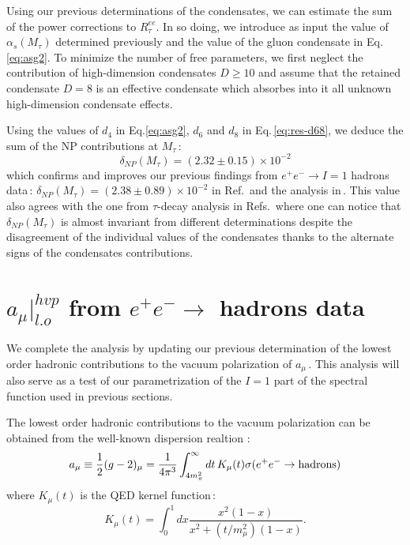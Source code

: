 \documentclass[review]{elsarticle}
\def\beq{\begin{equation}}
\def\eeq{\end{equation}}
\begin{document}
  Using our previous determinations of the condensates, we can estimate the sum of the power corrections to $R^{ee}_{\tau}$.
   In so doing, we introduce as input the value of $\alpha_s(M_\tau)$ determined previously and the value of the gluon condensate in Eq.\,\ref{eq:asg2}. To minimize the number of free parameters, we first neglect the contribution of high-dimension condensates $D\geq 10$ and assume that the retained condensate $D=8$ is an effective condensate which absorbes into it all unknown high-dimension condensate effects. 
   
 
 Using the values of $d_4$ in Eq.\ref{eq:asg2}, $d_6$ and $d_8$ in Eq.\,\ref{eq:res-d68}, we deduce the sum of the NP contributions at  $M_\tau$\,:
\beq
\delta_{NP}(M_\tau)= (2.32\pm 0.15)\times 10^{-2}
\eeq
which confirms and improves our previous findings from $e^+e^-\to I=1$ hadrons data\,: $\delta_{NP}(M_\tau)= (2.38\pm 0.89)\times 10^{-2}$ in Ref.\,\cite{SN95} and the analysis in\,\cite{SNTAU}.  This value also agrees with the one from $\tau$-decay analysis in Refs.\,\cite{ALEPH,OPAL,PICH1,PICH2,DAVIER} where one can notice that $\delta_{NP}(M_\tau)$ is almost invariant from different determinations despite the disagreement of the individual values of the condensates thanks to the alternate signs of the condensates contributions.

\section{$a_\mu\vert^{hvp}_{l.o}$ from   $e^+e^-\to$ hadrons data}
We complete the analysis by updating our previous determination of the  lowest order hadronic contributions  to the vacuum polarization of $a_\mu$\,\cite{SNamu}.  This analysis will also serve as a test of our parametrization of the $I=1$ part of the spectral function used in previous sections. 

The lowest order hadronic contributions to the vacuum polarization can be obtained from the
well-known dispersion realtion\,\cite{BOUCHIAT,DURAND,KINOSHITA,BOWCOCK,GOURDIN}\,:
\beq
a_\mu\equiv \frac{1}{2}(g-2)_\mu= \frac{1}{4\pi^3}\int_{4m_\pi^2}^\infty dt\, K_\mu(t)\sigma (e^+e^-\to {\rm hadrons})
\eeq
where $K_\mu(t)$ is the QED kernel function\,\cite{LAUTRUP}:
\beq
K_\mu(t)=\int_0^1dx\frac{x^2(1-x)}{x^2+(t/m_\mu^2)(1-x)}.
\label{eq:kmu}
\eeq
\end{document}
